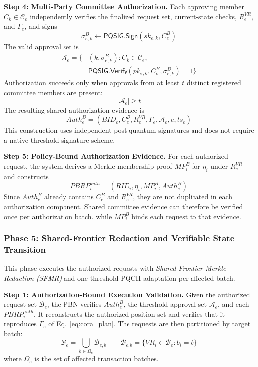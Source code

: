 \documentclass[lettersize,journal]{IEEEtran}
\begin{document}
\medskip
\noindent\textbf{Step 4: Multi-Party Committee Authorization.}
Each approving member $C_k\in\mathcal{C}_e$ independently verifies the
finalized request set, current-state checks, $R_e^{VR}$, and
$\Gamma_e$, and signs
\begin{equation}
\sigma_{e,k}^{B}
\leftarrow
\mathsf{PQSIG.Sign}
\left(
sk_{e,k},C_e^{B}
\right)
\end{equation}
The valid approval set is
\begin{equation}
\begin{aligned}
\mathcal{A}_e=\big\{&
(k,\sigma_{e,k}^{B}):
C_k\in\mathcal{C}_e,\\
&
\mathsf{PQSIG.Verify}
(pk_{e,k},C_e^{B},\sigma_{e,k}^{B})=1
\big\}
\end{aligned}
\end{equation}
Authorization succeeds only when approvals from at least $t$ distinct
registered committee members are present:
\begin{equation}
|\mathcal{A}_e|\geq t
\end{equation}
The resulting shared authorization evidence is
\begin{equation}
Auth_e^{B}
=
(BID_e,C_e^{B},R_e^{VR},\Gamma_e,
\mathcal{A}_e,e,ts_e)
\end{equation}
This construction uses independent post-quantum signatures and does not
require a native threshold-signature scheme.

\medskip
\noindent\textbf{Step 5: Policy-Bound Authorization Evidence.}
For each authorized request, the system derives a Merkle membership
proof $MP_i^{B}$ for $\eta_i$ under $R_e^{VR}$ and constructs
\begin{equation}
PBRP_i^{auth}
=
(RID_i,\eta_i,MP_i^{B},Auth_e^{B})
\end{equation}
Since $Auth_e^{B}$ already contains $C_e^{B}$ and $R_e^{VR}$, they are
not duplicated in each authorization component. Shared committee
evidence can therefore be verified once per authorization batch, while
$MP_i^{B}$ binds each request to that evidence.    
 \subsubsection*{\textbf{Phase 5: Shared-Frontier Redaction and
Verifiable State Transition}}

This phase executes the authorized requests with \emph{Shared-Frontier
Merkle Redaction (SFMR)} and one threshold PQCH adaptation per affected
batch.

\medskip
\noindent\textbf{Step 1: Authorization-Bound Execution Validation.}
Given the authorized request set $\mathcal{B}_e$, the PBN verifies
$Auth_e^B$, the threshold approval set $\mathcal{A}_e$, and each
$PBRP_i^{auth}$. It reconstructs the authorized position set and
verifies that it reproduces $\Gamma_e$ of Eq.~\eqref{eq:cora_plan}.
The requests are then partitioned by target batch:
\begin{equation}
\mathcal{B}_e
=
\bigcup_{b\in\Omega_e}\mathcal{B}_{e,b}
\qquad
\mathcal{B}_{e,b}
=
\{VR_i\in\mathcal{B}_e:b_i=b\}
\end{equation}
where $\Omega_e$ is the set of affected transaction batches.
\end{document}

